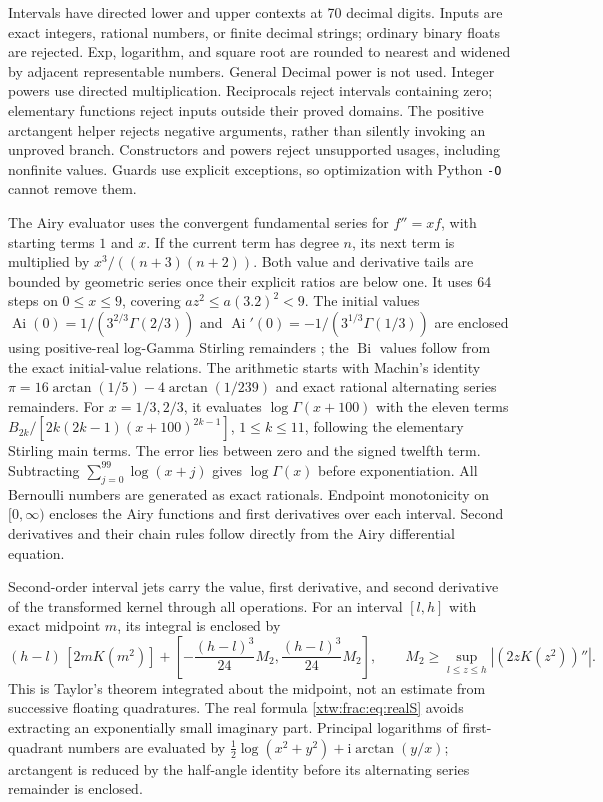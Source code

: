 \documentclass[11pt]{article}
\theoremstyle{remark}\newtheorem{remark}[theorem]{Remark}
\newcommand{\Ai}{\operatorname{Ai}}
\newcommand{\Bi}{\operatorname{Bi}}
\newcommand{\ii}{\mathrm i}
\begin{document}
Intervals have directed lower and upper contexts at 70 decimal digits.
Inputs are exact integers, rational numbers, or finite decimal strings;
ordinary binary floats are rejected. Exp, logarithm, and square root are
rounded to nearest and widened by adjacent representable numbers. General
Decimal power is not used. Integer powers use directed multiplication.
Reciprocals reject intervals containing zero; elementary functions reject
inputs outside their proved domains. The positive arctangent helper rejects
negative arguments, rather than silently invoking an unproved branch.
Constructors and powers reject unsupported usages, including nonfinite
values. Guards use explicit exceptions, so optimization with Python
\texttt{-O} cannot remove them.

The Airy evaluator uses the convergent fundamental series for $f''=xf$,
with starting terms $1$ and $x$. If the current term has degree $n$,
its next term is multiplied by $x^3/((n+3)(n+2))$.
Both value and derivative tails are bounded by geometric series once their
explicit ratios are below one. It uses 64 steps on $0\le x\le9$, covering
$az^2\le a(3.2)^2<9$. The initial values
$\Ai(0)=1/(3^{2/3}\Gamma(2/3))$ and
$\Ai'(0)=-1/(3^{1/3}\Gamma(1/3))$ are enclosed using positive-real
log-Gamma Stirling remainders \cite{dlmfgamma}; the $\Bi$ values follow
from the exact initial-value relations.
The arithmetic starts with Machin's identity
$\pi=16\arctan(1/5)-4\arctan(1/239)$ and exact rational alternating
series remainders. For $x=1/3,2/3$, it evaluates $\log\Gamma(x+100)$
with the eleven terms $B_{2k}/[2k(2k-1)(x+100)^{2k-1}]$,
$1\le k\le11$, following the elementary Stirling main terms.
The error lies between zero and the signed twelfth term. Subtracting
$\sum_{j=0}^{99}\log(x+j)$ gives $\log\Gamma(x)$ before exponentiation.
All Bernoulli numbers are generated as exact rationals.
Endpoint monotonicity on $[0,\infty)$ encloses the Airy functions and
first derivatives over each interval. Second derivatives and their chain
rules follow directly from the Airy differential equation.

Second-order interval jets carry the value, first derivative, and second
derivative of the transformed kernel through all operations.
For an interval $[l,h]$ with exact midpoint $m$, its integral is enclosed by
\begin{equation}\label{xtw:frac:eq:midpointcertificate}
 (h-l)\,[2mK(m^2)]
   +\left[-\frac{(h-l)^3}{24}M_2,\frac{(h-l)^3}{24}M_2\right],
 \qquad M_2\ge\sup_{l\le z\le h}|(2zK(z^2))''|.
\end{equation}
This is Taylor's theorem integrated about the midpoint, not an estimate
from successive floating quadratures. The real formula
\eqref{xtw:frac:eq:realS} avoids extracting an exponentially small imaginary part.
Principal logarithms of first-quadrant numbers are evaluated by
$\frac12\log(x^2+y^2)+\ii\arctan(y/x)$; arctangent is reduced by the
half-angle identity before its alternating series remainder is enclosed.
\end{document}
